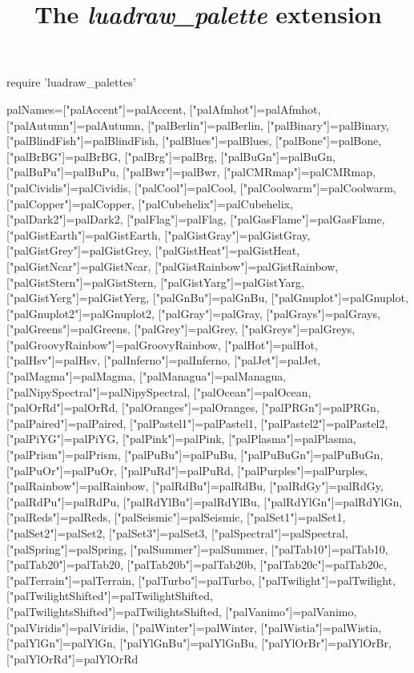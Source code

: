 \documentclass[10pt,a4paper,twocolumn]{article}%
\title{The \emph{luadraw\_palette} extension}
\date{}
\begin{document}
\maketitle{}


\begin{luacode*}
require 'luadraw_palettes'

palNames={["palAccent"]=palAccent, ["palAfmhot"]=palAfmhot, ["palAutumn"]=palAutumn, ["palBerlin"]=palBerlin, ["palBinary"]=palBinary, ["palBlindFish"]=palBlindFish, ["palBlues"]=palBlues, ["palBone"]=palBone, ["palBrBG"]=palBrBG, ["palBrg"]=palBrg, ["palBuGn"]=palBuGn, ["palBuPu"]=palBuPu, ["palBwr"]=palBwr, ["palCMRmap"]=palCMRmap, ["palCividis"]=palCividis, ["palCool"]=palCool, ["palCoolwarm"]=palCoolwarm, ["palCopper"]=palCopper, ["palCubehelix"]=palCubehelix, ["palDark2"]=palDark2, ["palFlag"]=palFlag, ["palGasFlame"]=palGasFlame, ["palGistEarth"]=palGistEarth, ["palGistGray"]=palGistGray, ["palGistGrey"]=palGistGrey, ["palGistHeat"]=palGistHeat, ["palGistNcar"]=palGistNcar, ["palGistRainbow"]=palGistRainbow, ["palGistStern"]=palGistStern, ["palGistYarg"]=palGistYarg, ["palGistYerg"]=palGistYerg, ["palGnBu"]=palGnBu, ["palGnuplot"]=palGnuplot, ["palGnuplot2"]=palGnuplot2, ["palGray"]=palGray, ["palGrays"]=palGrays, ["palGreens"]=palGreens, ["palGrey"]=palGrey, ["palGreys"]=palGreys, ["palGroovyRainbow"]=palGroovyRainbow, ["palHot"]=palHot, ["palHsv"]=palHsv, ["palInferno"]=palInferno, ["palJet"]=palJet, ["palMagma"]=palMagma, ["palManagua"]=palManagua, ["palNipySpectral"]=palNipySpectral, ["palOcean"]=palOcean, ["palOrRd"]=palOrRd, ["palOranges"]=palOranges, ["palPRGn"]=palPRGn, ["palPaired"]=palPaired, ["palPastel1"]=palPastel1, ["palPastel2"]=palPastel2, ["palPiYG"]=palPiYG, ["palPink"]=palPink, ["palPlasma"]=palPlasma, ["palPrism"]=palPrism, ["palPuBu"]=palPuBu, ["palPuBuGn"]=palPuBuGn, ["palPuOr"]=palPuOr, ["palPuRd"]=palPuRd, ["palPurples"]=palPurples, ["palRainbow"]=palRainbow, ["palRdBu"]=palRdBu, ["palRdGy"]=palRdGy, ["palRdPu"]=palRdPu, ["palRdYlBu"]=palRdYlBu, ["palRdYlGn"]=palRdYlGn, ["palReds"]=palReds, ["palSeismic"]=palSeismic, ["palSet1"]=palSet1, ["palSet2"]=palSet2, ["palSet3"]=palSet3, ["palSpectral"]=palSpectral, ["palSpring"]=palSpring, ["palSummer"]=palSummer, ["palTab10"]=palTab10, ["palTab20"]=palTab20, ["palTab20b"]=palTab20b, ["palTab20c"]=palTab20c, ["palTerrain"]=palTerrain, ["palTurbo"]=palTurbo, ["palTwilight"]=palTwilight, ["palTwilightShifted"]=palTwilightShifted, ["palTwilightsShifted"]=palTwilightsShifted, ["palVanimo"]=palVanimo, ["palViridis"]=palViridis, ["palWinter"]=palWinter, ["palWistia"]=palWistia, ["palYlGn"]=palYlGn, ["palYlGnBu"]=palYlGnBu, ["palYlOrBr"]=palYlOrBr, ["palYlOrRd"]=palYlOrRd}


\end{luacode*}
\end{document}
